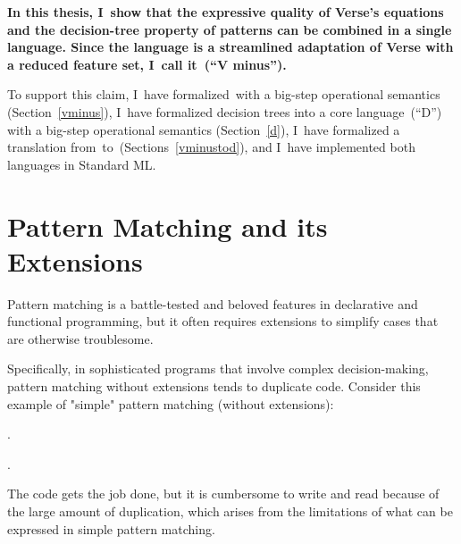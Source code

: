 \documentclass[manuscript,screen,12pt, nonacm]{acmart}
\begin{document}

\bf{In this thesis, I~show} that the expressive quality of Verse's equations and
the decision-tree property of patterns can be combined in a single language.
Since the language is a streamlined adaptation of Verse with a reduced feature
set, I~call it~\VMinus (“V minus”). 

To support this claim, I~have formalized~\VMinus with a big-step operational
semantics (Section~\ref{vminus}), I~have formalized decision trees into a core
language~\D (“D”) with a big-step operational semantics (Section~\ref{d}), 
I~have formalized a translation from~\VMinus to~\D (Sections~\ref{vminustod}),
and I~have implemented both languages in Standard ML. 



\section{Pattern Matching and its Extensions}
\label{pmandextensions}
    \textbf{}


    Pattern matching is a battle-tested and beloved features in declarative and
    functional programming, but it often requires extensions to simplify cases
    that are otherwise troublesome. 
    
    
    Specifically, in sophisticated programs that involve complex
    decision-making, pattern matching without extensions tends to duplicate
    code. Consider this example of "simple" pattern matching (without
    extensions): 

    .

    . 

    The code gets the job done, but it is cumbersome to write and read because
    of the large amount of duplication, which arises from the limitations of
    what can be expressed in simple pattern matching. 
    
\end{document}
